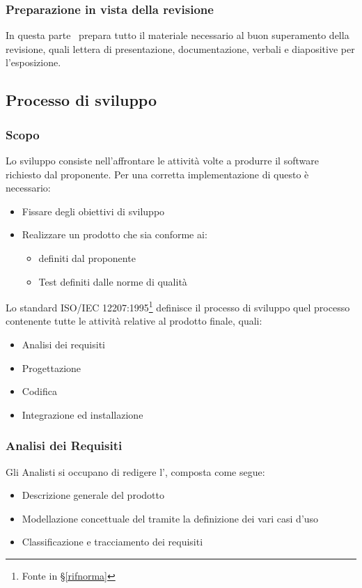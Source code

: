         \subsubsection{Preparazione in vista della revisione}
		In questa parte \gruppo\ prepara tutto il materiale necessario al buon superamento della revisione, quali lettera di presentazione,
		documentazione, verbali e diapositive per l'esposizione.


    \subsection{Processo di sviluppo}\label{PP:Sviluppo}

		\subsubsection{Scopo}\label{PP:Sviluppo:Scopo}
		Lo sviluppo consiste nell'affrontare le attività volte a produrre il software richiesto dal proponente. Per una corretta implementazione di questo  è necessario:
		\begin{itemize}
			\item Fissare degli obiettivi di sviluppo
			\item Realizzare un prodotto che sia conforme ai:
			\begin{itemize}
				\item {} definiti dal proponente
				\item Test definiti dalle norme di qualità
			\end{itemize}
		\end{itemize}
		Lo standard ISO/IEC 12207:1995\footnote{Fonte in \S\ref{rifnorma}} definisce il processo di sviluppo quel processo contenente tutte le attività relative al prodotto finale, quali:
		\begin{itemize} %
			\item Analisi dei requisiti
			\item Progettazione
			\item Codifica
			\item Integrazione ed installazione
		\end{itemize}


        \subsubsection{Analisi dei Requisiti}\label{PP:Sviluppo:AdR}
		Gli Analisti si occupano di redigere l'\Doc{\AdRv}, composta come segue:
		\begin{itemize}
			\item Descrizione generale del prodotto
			\item Modellazione concettuale del  tramite la definizione dei vari casi d'uso
			\item Classificazione e tracciamento dei requisiti
		\end{itemize}

